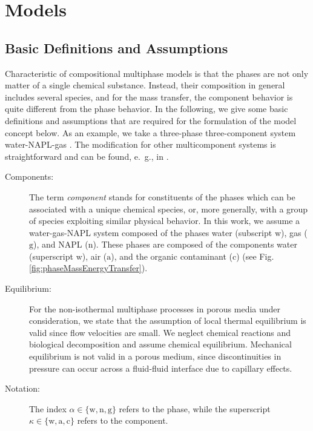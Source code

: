 \section{Models}
\subsection{Basic Definitions and Assumptions}
Characteristic of compositional multiphase models is that the phases
are not only matter of a single chemical substance. Instead, their
composition in general includes several species, and for the mass transfer,
the component behavior is quite different from the phase behavior. In the following, we
give some basic definitions and assumptions that are required for the
formulation of the model concept below. As an example, we take a
three-phase three-component system water-NAPL-gas
\cite{A3:class:2002a}. The modification for other multicomponent
systems is straightforward and can be found, e.\ g., in
\cite{A3:bielinski:2006,A3:acosta:2006}.

\begin{description}
\item[Components:]
The term {\it component} stands for constituents of the phases which
can be associated with a unique chemical species, or, more generally, with
a group of species exploiting similar physical behavior. In this work, we
assume a water-gas-NAPL system composed of the phases water (subscript
$\text{w}$), gas ($\text{g}$), and NAPL ($\text{n}$). These phases are
composed of the components water (superscript $\text{w}$), air
($\text{a}$), and the organic contaminant ($\text{c}$) (see Fig.
\ref{fig:phaseMassEnergyTransfer}).

\item[Equilibrium:]
For the non-isothermal multiphase processes in porous media under
consideration, we state that the assumption of local thermal
equilibrium is valid since flow velocities are small. We neglect
chemical reactions and biological decomposition and assume chemical
equilibrium.  Mechanical equilibrium is not valid in a porous medium,
since discontinuities in pressure can occur across a fluid-fluid
interface due to capillary effects.

\item[Notation:]
The index $\alpha \in \{\text{w}, \text{n}, \text{g}\}$ refers
to the phase, while the superscript $\kappa \in \{\text{w}, \text{a}, \text{c}\}$ refers
to the component.
\end{description}

